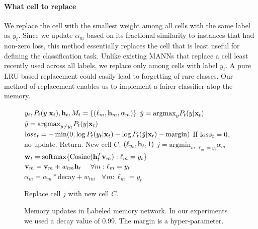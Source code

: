 \documentclass[letterpaper]{article} %
\newcommand{\vek}[1]{{\bf {#1}}}
\newcommand{\vx}{{\vek{x}}}
\newcommand{\vw}{{\vek{w}}}
\newcommand{\vh}{{\vek{h}}}
\newcommand{\vM}{{\vek{v}}}
\newcommand{\argmax}{{\text{argmax}}}
\newcommand{\argmin}{{\text{argmin}}}
\newcommand{\loss}{{\text loss}}
\def\shiv#1{\todo [color=orange]{Shiv: #1}}
\begin{document}
\paragraph{What cell to replace} We replace the cell with the smallest weight among all cells with the same label as $y_t$. %
Since we update $\alpha_m$ based on its fractional similarity to instances that had non-zero loss, this method essentially replaces the cell that is least useful for defining the classification task.  Unlike existing MANNs that replace a cell least recently used across all labels, we replace only among cells with label $y_t$. A pure LRU based replacement could easily lead to forgetting of rare classes.  Our method of replacement enables us to implement a fairer classifier atop the memory.

\begin{figure}
\begin{center}
\begin{algorithmic}
   $y_t, P_t(y|\vx_t), \vh_t, M_t = \{(\ell_m, \vh_m, \alpha_m)\}$
  \STATE $\hat{y} = \argmax_y P_t(y|\vx_t)$
  \STATE $\tilde{y} = \argmax_{y \neq y_t} P_t(y|\vx_t)$
  \STATE $\loss_t = - \min(0, \log P_t(y_t|\vx_t) - \log P_t(\tilde{y}|\vx_t) - \text{margin} )$
  \STATE If $\loss_t=0$, no update. Return.
  \STATE New cell $C$: $(\ell_{y_t}, \vh_t, 1)$
  \STATE $j = \argmin_{m:\ell_m = y_t} \alpha_m$
  \STATE $\vw_t = \text{softmax}\{\text{Cosine}(\vh_t^T \vM_m) :\ell_m = y_t\}$
  \STATE $\vM_{m} = \vM_{m} + w_{tm}{\vh_t}~~~~\forall m: \ell_m = y_t$
  \STATE $\alpha_{m} = \alpha_m*\text{decay} + w_{tm}~~~~\forall m: \ell_m = y_t$

  \STATE Replace cell $j$ with new cell $C$.
  \ENDIF
\end{algorithmic}
\caption{\label{alg-write}Memory updates in Labeled memory network. In our experiments we used a decay value of 0.99.   The margin is a hyper-parameter.}
\end{center}
\end{figure}
\end{document}
